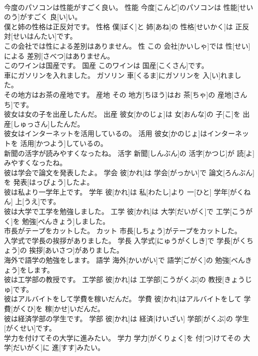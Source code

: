 \documentclass[8pt]{extreport}
\begin{document}
\begin{CJK}{UTF8}{min}
\\	今度のパソコンは性能がすごく良い。	性能	今度[こんど]のパソコンは 性能[せいのう]がすごく 良[い]い。	
\\	僕と姉の性格は正反対です。	性格	僕[ぼく]と 姉[あね]の 性格[せいかく]は 正反対[せいはんたい]です。	
\\	この会社では性による差別はありません。	性	この 会社[かいしゃ]では 性[せい]による 差別[さべつ]はありません。	
\\	このワインは国産です。	国産	このワインは 国産[こくさん]です。	
\\	車にガソリンを入れました。	ガソリン	車[くるま]にガソリンを 入[い]れました。	
\\	その地方はお茶の産地です。	産地	その 地方[ちほう]はお 茶[ちゃ]の 産地[さんち]です。	
\\	彼女は女の子を出産したんだ。	出産	彼女[かのじょ]は 女[おんな]の 子[こ]を 出産[しゅっさん]したんだ。	
\\	彼女はインターネットを活用しているの。	活用	彼女[かのじょ]はインターネットを 活用[かつよう]しているの。	
\\	新聞の活字が読みやすくなったね。	活字	新聞[しんぶん]の 活字[かつじ]が 読[よ]みやすくなったね。	
\\	彼は学会で論文を発表したよ。	学会	彼[かれ]は 学会[がっかい]で 論文[ろんぶん]を 発表[はっぴょう]したよ。	
\\	彼は私より一学年上です。	学年	彼[かれ]は 私[わたし]より 一[ひと] 学年[がくねん] 上[うえ]です。	
\\	彼は大学で工学を勉強しました。	工学	彼[かれ]は 大学[だいがく]で 工学[こうがく]を 勉強[べんきょう]しました。	
\\	市長がテープをカットした。	カット	市長[しちょう]がテープをカットした。	
\\	入学式で学長の挨拶がありました。	学長	入学式[にゅうがくしき]で 学長[がくちょう]の 挨拶[あいさつ]がありました。	
\\	海外で語学の勉強をします。	語学	海外[かいがい]で 語学[ごがく]の 勉強[べんきょう]をします。	
\\	彼は工学部の教授です。	工学部	彼[かれ]は 工学部[こうがくぶ]の 教授[きょうじゅ]です。	
\\	彼はアルバイトをして学費を稼いだんだ。	学費	彼[かれ]はアルバイトをして 学費[がくひ]を 稼[かせ]いだんだ。	
\\	彼は経済学部の学生です。	学部	彼[かれ]は 経済[けいざい] 学部[がくぶ]の 学生[がくせい]です。	
\\	学力を付けてその大学に進みたい。	学力	学力[がくりょく]を 付[つ]けてその 大学[だいがく]に 進[すす]みたい。	

\end{CJK}
\end{document}
